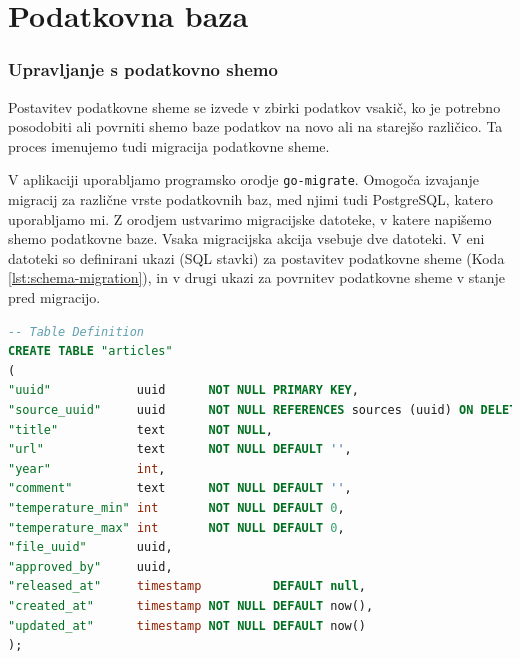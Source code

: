 \documentclass[a4paper, 12pt]{book}
\begin{document}
\section{Podatkovna baza }

\subsubsection{Upravljanje s podatkovno shemo}
Postavitev podatkovne sheme se izvede v zbirki podatkov vsakič, ko je potrebno posodobiti ali povrniti shemo baze podatkov na novo ali na starejšo različico. Ta proces imenujemo tudi migracija podatkovne sheme.

V aplikaciji uporabljamo programsko orodje \verb=go-migrate=. Omogoča izvajanje migracij za različne vrste podatkovnih baz, med njimi tudi PostgreSQL, katero uporabljamo mi. Z orodjem ustvarimo migracijske datoteke, v katere napišemo shemo podatkovne baze. Vsaka migracijska akcija vsebuje dve datoteki. V eni datoteki so definirani ukazi (SQL stavki) za postavitev podatkovne sheme (Koda \ref{lst:schema-migration}), in v drugi ukazi za  povrnitev podatkovne sheme v stanje pred migracijo.


\begin{lstlisting}[language=sql, style=mystyle,caption={Izsek koda, za kreiranje tabele "articles", namenjeno hranjenju podatkov o publikacijah.},label=lst:schema-migration]
-- Table Definition
CREATE TABLE "articles"
(
"uuid"            uuid      NOT NULL PRIMARY KEY,
"source_uuid"     uuid      NOT NULL REFERENCES sources (uuid) ON DELETE CASCADE,
"title"           text      NOT NULL,
"url"             text      NOT NULL DEFAULT '',
"year"            int,
"comment"         text      NOT NULL DEFAULT '',
"temperature_min" int       NOT NULL DEFAULT 0,
"temperature_max" int       NOT NULL DEFAULT 0,
"file_uuid"       uuid,
"approved_by"     uuid,
"released_at"     timestamp          DEFAULT null,
"created_at"      timestamp NOT NULL DEFAULT now(),
"updated_at"      timestamp NOT NULL DEFAULT now()
);
\end{lstlisting}

\end{document}
